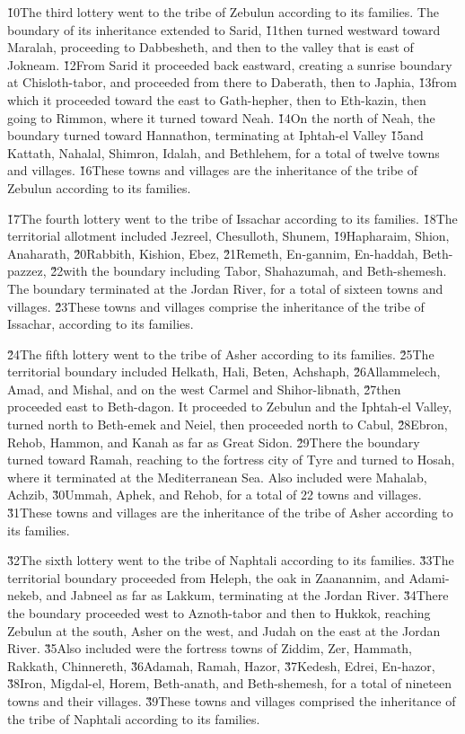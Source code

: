 \v{10}The third lottery went to the tribe of Zebulun according to its families. The boundary of its inheritance extended to Sarid, \v{11}then turned westward toward Maralah, proceeding to Dabbesheth, and then to the valley that is east of Jokneam. \v{12}From Sarid it proceeded back eastward, creating a sunrise boundary at Chisloth-tabor, and proceeded from there to Daberath, then to Japhia, \v{13}from which it proceeded toward the east to Gath-hepher, then to Eth-kazin, then going to Rimmon, where it turned toward Neah. \v{14}On the north of Neah, the boundary turned toward Hannathon, terminating at Iphtah-el Valley \v{15}and Kattath, Nahalal, Shimron, Idalah, and Bethlehem, for a total of twelve towns and villages. \v{16}These towns and villages are the inheritance of the tribe of Zebulun according to its families.

\v{17}The fourth lottery went to the tribe of Issachar according to its families. \v{18}The territorial allotment included Jezreel, Chesulloth, Shunem, \v{19}Hapharaim, Shion, Anaharath, \v{20}Rabbith, Kishion, Ebez, \v{21}Remeth, En-gannim, En-haddah, Beth-pazzez, \v{22}with the boundary including Tabor, Shahazumah, and Beth-shemesh. The boundary terminated at the Jordan River, for a total of sixteen towns and villages. \v{23}These towns and villages comprise the inheritance of the tribe of Issachar, according to its families.

\v{24}The fifth lottery went to the tribe of Asher according to its families. \v{25}The territorial boundary included Helkath, Hali, Beten, Achshaph, \v{26}Allammelech, Amad, and Mishal, and on the west Carmel and Shihor-libnath, \v{27}then proceeded east to Beth-dagon. It proceeded to Zebulun and the Iphtah-el Valley, turned north to Beth-emek and Neiel, then proceeded north to Cabul, \v{28}Ebron, Rehob, Hammon, and Kanah as far as Great Sidon. \v{29}There the boundary turned toward Ramah, reaching to the fortress city of Tyre and turned to Hosah, where it terminated at the Mediterranean Sea. Also included were Mahalab, Achzib, \v{30}Ummah, Aphek, and Rehob, for a total of 22 towns and villages. \v{31}These towns and villages are the inheritance of the tribe of Asher according to its families.

\v{32}The sixth lottery went to the tribe of Naphtali according to its families. \v{33}The territorial boundary proceeded from Heleph, the oak in Zaanannim, and Adami-nekeb, and Jabneel as far as Lakkum, terminating at the Jordan River. \v{34}There the boundary proceeded west to Aznoth-tabor and then to Hukkok, reaching Zebulun at the south, Asher on the west, and Judah on the east at the Jordan River. \v{35}Also included were the fortress towns of Ziddim, Zer, Hammath, Rakkath, Chinnereth, \v{36}Adamah, Ramah, Hazor, \v{37}Kedesh, Edrei, En-hazor, \v{38}Iron, Migdal-el, Horem, Beth-anath, and Beth-shemesh, for a total of nineteen towns and their villages. \v{39}These towns and villages comprised the inheritance of the tribe of Naphtali according to its families.

